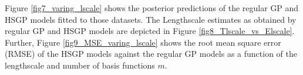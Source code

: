 \documentclass[]{interact}
\theoremstyle{plain}%
\theoremstyle{definition}
\theoremstyle{remark}
\begin{document}
Figure \ref{fig7_varing_lscale} shows the posterior predictions of the regular GP and HSGP models fitted to those datasets. The Lengthscale estimates as obtained by regular GP and HSGP models are depicted in Figure \ref{fig8_Tlscale_vs_Elscale}. Further, Figure \ref{fig9_MSE_varing_lscale} shows the root mean square error (RMSE) of the HSGP models against the regular GP models as a function of the lengthscale and number of basis functions $m$.

\begin{figure}
\centering
{}\\
\vspace{-3mm}

\end{figure}
\end{document}
